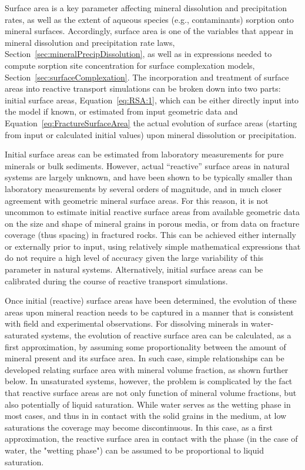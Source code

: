 Surface area is a key parameter affecting mineral dissolution and
precipitation rates, as well as the extent of aqueous species (e.g.,
contaminants) sorption onto mineral surfaces.  Accordingly, surface
area is one of the variables that appear in mineral dissolution and
precipitation rate laws, Section~\ref{sec:mineralPrecipDissolution},
as well as in expressions needed to compute sorption site
concentration for surface complexation models,
Section~\ref{sec:surfaceComplexation}.  The incorporation and
treatment of surface areas into reactive transport simulations can be
broken down into two parts: initial surface areas,
Equation~\eqref{eq:RSA:1}, which can be either directly input into the
model if known, or estimated from input geometric data and
Equation~\eqref{eq:FractureSurfaceArea} the actual evolution of surface areas
(starting from input or calculated initial values) upon mineral
dissolution or precipitation.

Initial surface areas can be estimated from laboratory measurements
for pure minerals or bulk sediments.  However, actual ``reactive''
surface areas in natural systems are largely unknown, and have been
shown to be typically smaller than laboratory measurements by several
orders of magnitude, and in much closer agreement with geometric
mineral surface areas.  For this reason, it is not uncommon to
estimate initial reactive surface areas from available geometric data
on the size and shape of mineral grains in porous media, or from data
on fracture coverage (thus spacing) in fractured rocks.  This can be
achieved either internally or externally prior to input, using
relatively simple mathematical expressions that do not require a high
level of accuracy given the large variability of this parameter in
natural systems.  Alternatively, initial surface areas can be
calibrated during the course of reactive transport simulations.

Once initial (reactive) surface areas have been determined, the
evolution of these areas upon mineral reaction needs to be captured in
a manner that is consistent with field and experimental observations.
For dissolving minerals in water-saturated systems, the evolution of
reactive surface area can be calculated, as a first approximation, by
assuming some proportionality between the amount of mineral present
and its surface area.  In such case, simple relationships can be
developed relating surface area with mineral volume fraction, as shown
further below.  In unsaturated systems, however, the problem is
complicated by the fact that reactive surface areas are not only
function of mineral volume fractions, but also potentially of liquid
saturation.  While water serves as the wetting phase in most cases,
and thus in in contact with the solid grains in the medium, at low
saturations the coverage may become discontinuous.  In this case, as a
first approximation, the reactive surface area in contact with the
phase (in the case of water, the "wetting phase") can be assumed to be
proportional to liquid saturation.

